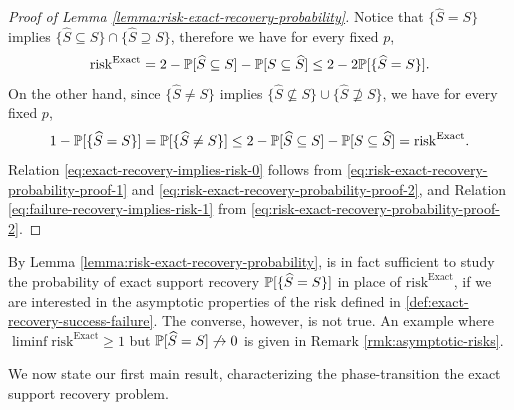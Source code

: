 \begin{proof}[Proof of Lemma \ref{lemma:risk-exact-recovery-probability}]
Notice that $\{\widehat{S}=S\}$ implies $\{\widehat{S}\subseteq S\} \cap \{\widehat{S}\supseteq S\}$, therefore we have for every fixed $p$,
\begin{equation} \label{eq:risk-exact-recovery-probability-proof-1}
    \mathrm{risk}^{\mathrm{Exact}} 
    = 2 - \P[\widehat{S} \subseteq S] - \P[S \subseteq \widehat{S}] \\
    \le 2 - 2\P[\{\widehat{S}=S\}].
\end{equation}
On the other hand, since $\{\widehat{S}\neq S\}$ implies $\{\widehat{S}\not\subseteq S\} \cup \{\widehat{S}\not\supseteq S\}$, we have for every fixed $p$,
\begin{equation} \label{eq:risk-exact-recovery-probability-proof-2}
    1 - \P[\{\widehat{S}=S\}]
    = \P[\{\widehat{S}\neq S\}]
    \le 2 - \P[\widehat{S} \subseteq S] - \P[S \subseteq \widehat{S}]
    = \mathrm{risk}^{\mathrm{Exact}}. 
\end{equation}
Relation \eqref{eq:exact-recovery-implies-risk-0} follows from \eqref{eq:risk-exact-recovery-probability-proof-1} and \eqref{eq:risk-exact-recovery-probability-proof-2}, and Relation \eqref{eq:failure-recovery-implies-risk-1} from \eqref{eq:risk-exact-recovery-probability-proof-2}.
\end{proof}

\begin{remark}
By Lemma \ref{lemma:risk-exact-recovery-probability}, is in fact sufficient to study the probability of exact support recovery $\P[\{\widehat{S}=S\}]$ in place of $\mathrm{risk}^{\mathrm{Exact}}$, if we are interested in the asymptotic properties of the risk defined in \eqref{def:exact-recovery-success-failure}.
The converse, however, is not true.
An example where $\liminf\mathrm{risk}^{\mathrm{Exact}}\ge1$ but $\P[\widehat{S} = S] \not\to 0$ is given in Remark \ref{rmk:asymptotic-risks}.
\end{remark}

We now state our first main result, characterizing the phase-transition  the exact support recovery problem.

